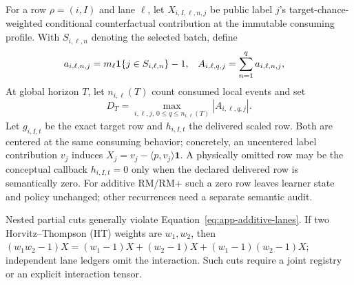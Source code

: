 For a row $\rho=(i,I)$ and lane $\ell$, let
$X_{i,I,\ell,n,j}$ be public label $j$'s target-chance-weighted conditional
counterfactual contribution at the immutable consuming profile.  With
$S_{i,\ell,n}$ denoting the selected batch, define
\begin{align}
a_{i,\ell,n,j}
  &=m_\ell\mathbf 1\{j\in S_{i,\ell,n}\}-1,
&A_{i,\ell,q,j}&=\sum_{n=1}^q a_{i,\ell,n,j},
\label{eq:app-public-coefficients}
\end{align}
At global horizon $T$, let $n_{i,\ell}(T)$ count consumed local events and set
\begin{equation}
D_T=\max_{i,\ell,j,\,0\le q\le n_{i,\ell}(T)}|A_{i,\ell,q,j}|.
\label{eq:app-joint-discrepancy}
\end{equation}
Let $g_{i,I,t}$ be the exact target row and
$h_{i,I,t}$ the delivered scaled row.  Both are centered at the
same consuming behavior; concretely, an uncentered label contribution $v_j$
induces $X_j=v_j-\langle p,v_j\rangle\mathbf 1$.  A physically omitted row may
be the conceptual callback $h_{i,I,t}=0$ only when the declared delivered row
is semantically zero.  For additive RM/RM+ such a zero row leaves learner
state and policy unchanged; other recurrences need a separate semantic audit.

Nested partial cuts generally violate
Equation~\ref{eq:app-additive-lanes}.  If two Horvitz--Thompson (HT) weights
are $w_1,w_2$, then
$(w_1w_2-1)X=(w_1-1)X+(w_2-1)X+(w_1-1)(w_2-1)X$; independent lane ledgers
omit the interaction.  Such cuts require a joint registry or an explicit
interaction tensor.

